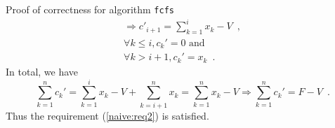 \begin{sepproof}{Proof of correctness for algorithm \texttt{fcfs}}
\begin{equation*}
\begin{gathered}
      \Rightarrow c'_{i+1} = \sum\limits_{k=1}^{i}x_k - V \enspace, \\
      \forall k \leq i, c_k' = 0 \mbox{ and} \\
      \forall k > i+1, c_k' = x_k \enspace.
   \end{gathered}
   \end{equation*}
   In total, we have
   \begin{equation*}
      \sum\limits_{k=1}^{n}c_k' = \sum\limits_{k=1}^{i}x_k - V + \sum\limits_{k=i+1}^{n}x_k =
   \sum\limits_{k=1}^{n}x_k - V \Rightarrow \sum\limits_{k=1}^{n}c_k' = F - V \enspace.
   \end{equation*}
   Thus the requirement (\ref{naive:req2}) is satisfied.
\end{sepproof}
